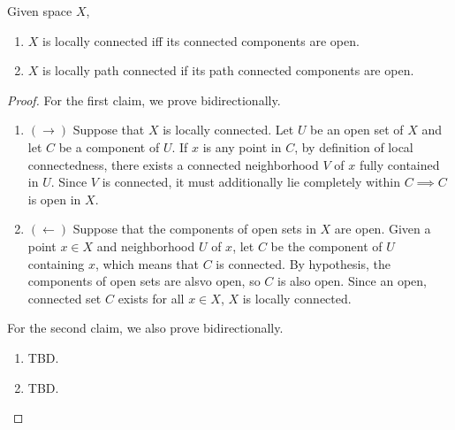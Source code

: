   \begin{theorem}
    Given space $X$, 
    \begin{enumerate}
      \item $X$ is locally connected iff its connected components are open. 
      \item $X$ is locally path connected if its path connected components are open. 
    \end{enumerate}
  \end{theorem}
  \begin{proof}
    For the first claim, we prove bidirectionally. 
    \begin{enumerate}
      \item $(\rightarrow)$ Suppose that $X$ is locally connected. Let $U$ be an open set of $X$ and let $C$ be a component of $U$. If $x$ is any point in $C$, by definition of local connectedness, there exists a connected neighborhood $V$ of $x$ fully contained in $U$. Since $V$ is connected, it must additionally lie completely within $C \implies C$ is open in $X$. 
      \item $(\leftarrow)$ Suppose that the components of open sets in $X$ are open. Given a point $x \in X$ and neighborhood $U$ of $x$, let $C$ be the component of $U$ containing $x$, which means that $C$ is connected. By hypothesis, the components of open sets are alsvo open, so $C$ is also open. Since an open, connected set $C$ exists for all $x \in X$, $X$ is locally connected. 
    \end{enumerate}
    For the second claim, we also prove bidirectionally. 
    \begin{enumerate}
      \item TBD. 
      \item TBD. 
    \end{enumerate}
  \end{proof}

